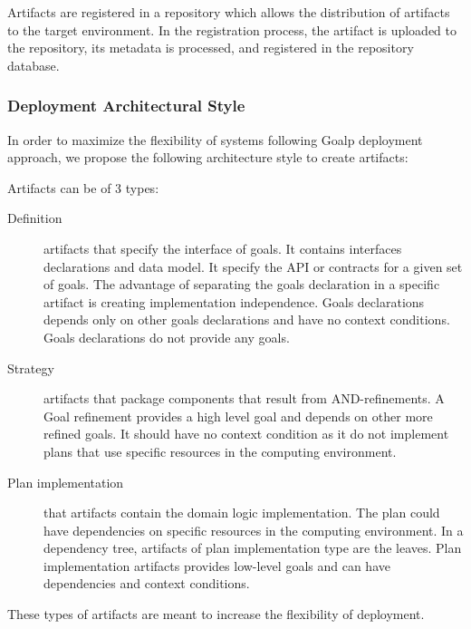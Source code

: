Artifacts are registered in a repository which allows the distribution of artifacts to the target environment. In the registration process, the artifact is uploaded to the repository, its metadata is processed, and registered in the repository database.


\subsubsection{Deployment Architectural Style}
\label{depl_arch_style}

In order to maximize the flexibility of systems following Goalp deployment approach, we propose the following architecture style to create artifacts:

Artifacts can be of 3 types:

\begin{description}
  \item[Definition] artifacts that specify the interface of goals. It contains interfaces declarations and data model. It specify the API or contracts for a given set of goals.
  The advantage of separating the goals declaration in a specific artifact is creating implementation independence.
  Goals declarations depends only on other goals declarations and have no context conditions. Goals declarations do not provide any goals.

  \item[Strategy] artifacts that package components that result from AND-refinements. A Goal refinement provides a high level goal and depends on other more refined goals. It should have no context condition as it do not implement plans that use specific resources in the computing environment.

  \item[Plan implementation] that artifacts contain the domain logic implementation. The plan could have dependencies on specific resources in the computing environment.
  In a dependency tree, artifacts of plan implementation type are the leaves.
  Plan implementation artifacts provides low-level goals and can have dependencies and context conditions.

\end{description}

These types of artifacts are meant to increase the flexibility of deployment.
